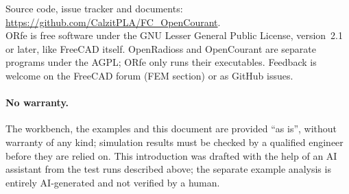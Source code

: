 \documentclass[11pt,a4paper]{article}
\begin{document}
Source code, issue tracker and documents:\\ \url{https://github.com/CalzitPLA/FC_OpenCourant}.\\
ORfe is free software under the GNU Lesser General Public License, version~2.1 or later, like
FreeCAD itself. OpenRadioss and OpenCourant are separate programs under the AGPL; ORfe only runs
their executables. Feedback is welcome on the FreeCAD forum (FEM section) or as GitHub issues.

\paragraph{No warranty.} The workbench, the examples and this document are provided ``as is'',
without warranty of any kind; simulation results must be checked by a qualified engineer before
they are relied on. This introduction was drafted with the help of an AI assistant from the test
runs described above; the separate example analysis is entirely AI-generated and not verified by a
human.
\end{document}

